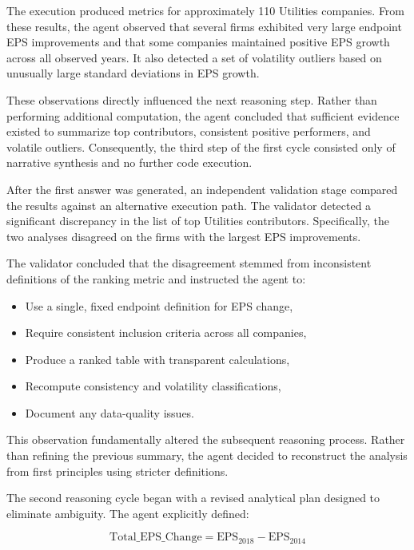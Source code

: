 The execution produced metrics for approximately 110 Utilities companies. From these results, the agent observed that several firms exhibited very large endpoint EPS improvements and that some companies maintained positive EPS growth across all observed years. It also detected a set of volatility outliers based on unusually large standard deviations in EPS growth.

These observations directly influenced the next reasoning step. Rather than performing additional computation, the agent concluded that sufficient evidence existed to summarize top contributors, consistent positive performers, and volatile outliers. Consequently, the third step of the first cycle consisted only of narrative synthesis and no further code execution.


After the first answer was generated, an independent validation stage compared the results against an alternative execution path. The validator detected a significant discrepancy in the list of top Utilities contributors. Specifically, the two analyses disagreed on the firms with the largest EPS improvements.

The validator concluded that the disagreement stemmed from inconsistent definitions of the ranking metric and instructed the agent to:

\begin{itemize}
  \item Use a single, fixed endpoint definition for EPS change,
  \item Require consistent inclusion criteria across all companies,
  \item Produce a ranked table with transparent calculations,
  \item Recompute consistency and volatility classifications,
  \item Document any data-quality issues.
\end{itemize}

This observation fundamentally altered the subsequent reasoning process. Rather than refining the previous summary, the agent decided to reconstruct the analysis from first principles using stricter definitions.


The second reasoning cycle began with a revised analytical plan designed to eliminate ambiguity. The agent explicitly defined:

\[
  \text{Total\_EPS\_Change} = \text{EPS}_{2018} - \text{EPS}_{2014}
\]

